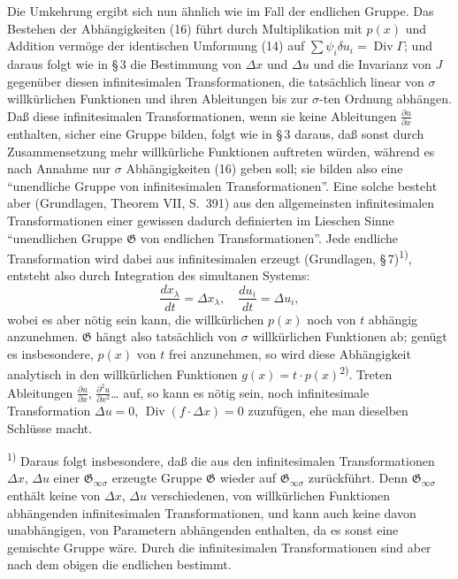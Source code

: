 \documentclass[12pt,a4paper]{article}
\begin{document}
Die Umkehrung ergibt sich nun \"ahnlich wie im Fall der endlichen Gruppe. Das Bestehen der Abh\"angigkeiten (16) f\"uhrt durch Multiplikation mit $p(x)$ und Addition verm\"oge der identischen Umformung (14) auf $\sum\psi_{i}\delta u_{i}=\operatorname{Div}\varGamma$; und daraus folgt wie in \S\,3 die Bestimmung von $\Delta x$ und $\Delta u$ und die Invarianz von $J$ gegen\"uber diesen infinitesimalen Transformationen, die tats\"achlich linear von $\sigma$ willk\"urlichen Funktionen und ihren Ableitungen bis zur $\sigma$-ten Ordnung abh\"angen. Da\ss{} diese infinitesimalen Transformationen, wenn sie keine Ableitungen $\tfrac{\partial u}{\partial x}$ enthalten, sicher eine Gruppe bilden, folgt wie in \S\,3 daraus, da\ss{} sonst durch Zusammensetzung mehr willk\"urliche Funktionen auftreten w\"urden, w\"ahrend es nach Annahme nur $\sigma$ Abh\"angigkeiten (16) geben soll; sie bilden also eine ``unendliche Gruppe von infinitesimalen Transformationen''. Eine solche besteht aber (Grundlagen, Theorem VII, S.\ 391) aus den allgemeinsten infinitesimalen Transformationen einer gewissen dadurch definierten im Lieschen Sinne ``unendlichen Gruppe $\mathfrak{G}$ von endlichen Transformationen''. Jede endliche Transformation wird dabei aus infinitesimalen erzeugt (Grundlagen, \S\,7)\textsuperscript{1)}, entsteht also durch Integration des simultanen Systems:
\begin{equation}\tag{18}
\frac{dx_{\lambda}}{dt}=\Delta x_{\lambda},\quad\frac{du_{i}}{dt}=\Delta u_{i},
\end{equation}
wobei es aber n\"otig sein kann, die willk\"urlichen $p(x)$ noch von $t$ abh\"angig anzunehmen. $\mathfrak{G}$ h\"angt also tats\"achlich von $\sigma$ willk\"urlichen Funktionen ab; gen\"ugt es insbesondere, $p(x)$ von $t$ frei anzunehmen, so wird diese Abh\"angigkeit analytisch in den willk\"urlichen Funktionen $g(x)=t\cdot p(x)$\textsuperscript{2)}. Treten Ableitungen $\tfrac{\partial u}{\partial x}$, $\tfrac{\partial^{2}u}{\partial x^{2}}$\ldots{} auf, so kann es n\"otig sein, noch infinitesimale Transformation $\Delta u=0$, $\operatorname{Div}(f\cdot\Delta x)=0$ zuzuf\"ugen, ehe man dieselben Schl\"usse macht.

\smallskip
\noindent\textsuperscript{1)} Daraus folgt insbesondere, da\ss{} die aus den infinitesimalen Transformationen $\Delta x$, $\Delta u$ einer $\mathfrak{G}_{\infty\sigma}$ erzeugte Gruppe $\mathfrak{G}$ wieder auf $\mathfrak{G}_{\infty\sigma}$ zur\"uckf\"uhrt. Denn $\mathfrak{G}_{\infty\sigma}$ enth\"alt keine von $\Delta x$, $\Delta u$ verschiedenen, von willk\"urlichen Funktionen abh\"angenden infinitesimalen Transformationen, und kann auch keine davon unabh\"angigen, von Parametern abh\"angenden enthalten, da es sonst eine gemischte Gruppe w\"are. Durch die infinitesimalen Transformationen sind aber nach dem obigen die endlichen bestimmt.
\end{document}
